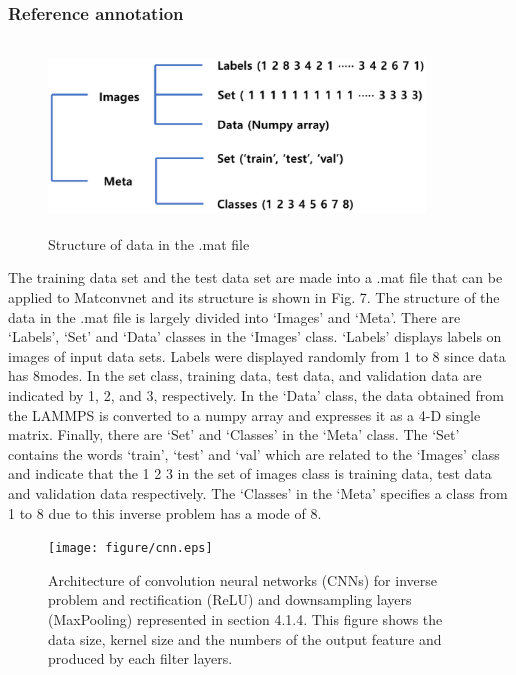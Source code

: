 \subsubsection{Reference annotation}
\label{subsubsec2}

\begin{figure}
\includegraphics[width=10cm, height=5cm]{figure/label.eps}
\caption{Structure of data in the .mat file}
\label{fig:4}       
\end{figure}
The training data set and the test data set are made into a .mat file that can be applied to Matconvnet and its structure is shown in Fig. 7. The structure of the data in the .mat file is largely divided into `Images' and `Meta'. There are `Labels', `Set' and `Data' classes in the `Images' class. `Labels' displays labels on images of input data sets. Labels were displayed randomly from 1 to 8 since data has 8modes. In the set class, training data, test data, and validation data are indicated by 1, 2, and 3, respectively. In the `Data' class, the data obtained from the LAMMPS is converted to a numpy array and expresses it as a 4-D single matrix. Finally, there are `Set' and `Classes' in the `Meta' class. The `Set' contains the words `train', `test' and `val' which are related to the `Images' class and indicate that the 1 2 3 in the set of images class is training data, test data and validation data respectively. The `Classes' in the `Meta' specifies a class from 1 to 8 due to this inverse problem has a mode of 8.
\begin{figure}
\texttt{[image: figure/cnn.eps]}
\caption{Architecture of convolution neural networks (CNNs) for inverse problem and rectification (ReLU) and downsampling layers (MaxPooling) represented in section 4.1.4. This figure shows the data size, kernel size and the numbers of the output feature and produced by each filter layers.}
\label{fig:5}       
\end{figure}
